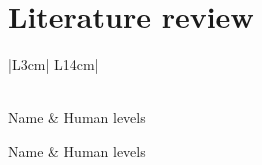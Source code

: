 \clearpage
\section{Literature review}
\label{literature_review}
\begin{center}


\begin{longtable}{|L{3cm}|%
L{14cm}|}
\caption{Human xenobiotic levels}\\

\hline
Name & %
Human levels \\
\hline
\hline
\endfirsthead

\hline
Name & %
Human levels \\
\hline
\hline
\endhead

\hline {} \\ \hline
\endfoot

\hline \hline
\endlastfoot



\end{longtable}
\end{center}
